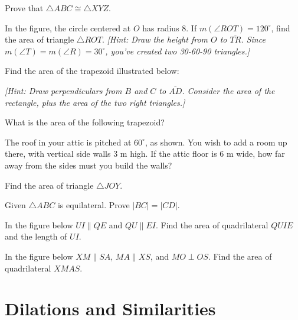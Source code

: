 \documentclass[12pt]{book} %
\begin{document}
\setcounter{Exercise}{0}
\begin{ExerciseList}
\Exercise Prove that $\triangle ABC\cong\triangle XYZ$.


\Exercise In the figure, the circle centered at $O$ has radius 8. If $m(\angle ROT)=120^\circ$, find the area of triangle $\triangle ROT$. \textit{[Hint: Draw the height from $O$ to $\overline{TR}$. Since $m(\angle T)=m(\angle R)=30^\circ$, you've created two 30-60-90 triangles.]}


\Exercise Find the area of the trapezoid illustrated below:


\textit{[Hint: Draw perpendiculars from $B$ and $C$ to $\overline{AD}$. Consider the area of the rectangle, plus the area of the two right triangles.]}

\Exercise What is the area of the following trapezoid?


\Exercise The roof in your attic is pitched at $60^\circ$, as shown. You wish to add a room up there, with vertical side walls 3 m high. If the attic floor is 6 m wide, how far away from the sides must you build the walls?


\Exercise Find the area of triangle $\triangle JOY$.


\Exercise Given $\triangle ABC$ is equilateral. Prove $|BC|=|CD|$.


\Exercise In the figure below $UI\parallel QE$ and $QU\parallel EI$. Find the area of quadrilateral $QUIE$ and the length of $UI$.


\Exercise In the figure below $XM\parallel SA$, $MA\parallel XS$, and $MO\perp OS$. Find the area of quadrilateral $XMAS$.

\end{ExerciseList}

\chapter{Dilations and Similarities}
\end{document}
